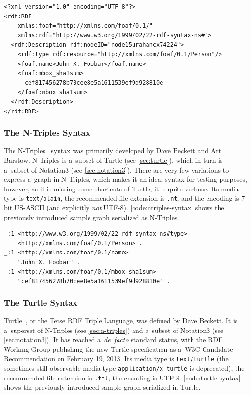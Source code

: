 \begin{lstlisting}[caption={Sample graph in RDF/XML syntax},
  label={code:rdfxml-syntax}]
<?xml version="1.0" encoding="UTF-8"?>
<rdf:RDF
    xmlns:foaf="http://xmlns.com/foaf/0.1/"
    xmlns:rdf="http://www.w3.org/1999/02/22-rdf-syntax-ns#">
  <rdf:Description rdf:nodeID="node15urahancx74224">
    <rdf:type rdf:resource="http://xmlns.com/foaf/0.1/Person"/>
    <foaf:name>John X. Foobar</foaf:name>
    <foaf:mbox_sha1sum>
      cef817456278b70cee8e5a1611539ef9d928810e
    </foaf:mbox_sha1sum>
  </rdf:Description>
</rdf:RDF>
\end{lstlisting}

\subsubsection{The N-Triples Syntax} \label{sec:n-triples}

The N-Triples~\cite{grant2004ntriples} syntax was primarily
developed by Dave Beckett and Art Barstow.
N-Triples is a~subset of Turtle (see \autoref{sec:turtle}),
which in turn is a~subset of Notation3
(see \autoref{sec:notation3}).
There are very few variations to express a~graph in N-Triples,
which makes it an ideal syntax for testing purposes, however,
as it is missing some shortcuts of Turtle, it is quite verbose.
Its media type is \texttt{text/plain}, the recommended file extension is \texttt{.nt},
and the encoding is 7-bit US-ASCII
(and explicitly \emph{not} UTF-8).
\autoref{code:ntriples-syntax} shows the previously
introduced sample graph serialized as N-Triples.

\pagebreak
\begin{lstlisting}[caption={Sample graph in N-Triples syntax},
  label={code:ntriples-syntax}]
_:1 <http://www.w3.org/1999/02/22-rdf-syntax-ns#type>
    <http://xmlns.com/foaf/0.1/Person> .
_:1 <http://xmlns.com/foaf/0.1/name>
    "John X. Foobar" .
_:1 <http://xmlns.com/foaf/0.1/mbox_sha1sum>
    "cef817456278b70cee8e5a1611539ef9d928810e" .
\end{lstlisting}

\subsubsection{The Turtle Syntax} \label{sec:turtle}

Turtle~\cite{prudhommeaux2013turtle},
or the Terse RDF Triple Language, was defined by Dave Beckett.
It is a~superset of N-Triples (see \autoref{sec:n-triples}) and
a~subset of Notation3 (see \autoref{sec:notation3}).
It has reached a~\emph{de~facto} standard status,
with the RDF Working Group publishing the new Turtle specification
as a~W3C Candidate Recommendation on February 19, 2013.
Its media type is \texttt{text/turtle}
(the sometimes still observable media type
\texttt{application/x-turtle} is deprecated),
the recommended file extension is \texttt{.ttl},
the encoding is UTF-8.
\autoref{code:turtle-syntax} shows the previously
introduced sample graph serialized in Turtle.

